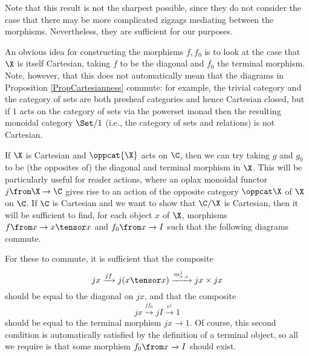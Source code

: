 Note that this result is not the sharpest possible, since they do not consider the case that there may be more complicated zigzags mediating between the morphisms.
Nevertheless, they are sufficient for our purposes.

An obvious idea for constructing the morphisms $f,f_0$ is to look at the case that $\X$ is itself Cartesian, taking $f$ to be the diagonal and $f_0$ the terminal morphism.
Note, however, that this does not automatically mean that the diagrams in Proposition \ref{PropCartesianness} commute: for example, the trivial category and the category of sets are both presheaf categories and hence Cartesian closed, but if $1$ acts on the category of sets via the powerset monad then the resulting monoidal category $\Set/1$ (i.e., the category of sets and relations) is not Cartesian.

If $\X$ is Cartesian and $\oppcat{\X}$ acts on $\C$, then we can try taking $g$ and $g_0$ to be (the opposites of) the diagonal and terminal morphism in $\X$.
This will be particularly useful for reader actions, where an oplax monoidal functor $j\from \X \to \C$ gives rise to an action of the opposite category $\oppcat\X$ of $\X$ on $\C$.  
If $\C$ is Cartesian and we want to show that $\C/\X$ is Cartesian, then it will be sufficient to find, for each object $x$ of $\X$, morphisms $f \from x \to x\tensor x$ and $f_0 \from x \to I$ such that the following diagrams commute.
For these to commute, it is sufficient that the composite
\[
  jx \xrightarrow{jf} j(x \tensor x) \xrightarrow{m^j_{x,x}} jx \times jx
  \]
should be equal to the diagonal on $jx$, and that the composite
\[
  jx \xrightarrow{jf_0} jI \xrightarrow{e^j} 1
  \]
should be equal to the terminal morphism $jx \to 1$.  
Of course, this second condition is automatically satisfied by the definition of a terminal object, so all we require is that some morphism $f_0 \from x \to I$ should exist.

